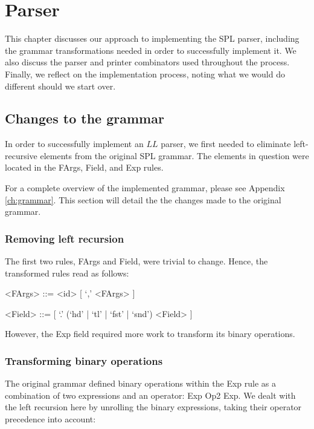 \chapter{Parser}

This chapter discusses our approach to implementing the SPL parser, including the grammar transformations needed in order to successfully implement it.
We also discuss the parser and printer combinators used throughout the process.
Finally, we reflect on the implementation process, noting what we would do different should we start over.

\section{Changes to the grammar}

In order to successfully implement an $LL$ parser, we first needed to eliminate left-recursive elements from the original SPL grammar.
The elements in question were located in the \textsf{FArgs}, \textsf{Field}, and \textsf{Exp} rules.

For a complete overview of the implemented grammar, please see Appendix \ref{ch:grammar}.
This section will detail the the changes made to the original grammar.

\subsection{Removing left recursion}

The first two rules, \textsf{FArgs} and \textsf{Field}, were trivial to change.
Hence, the transformed rules read as follows:

\begin{framed}
	\begin{grammar}
	<FArgs> ::= <id> [ `,' <FArgs> ]

	<Field> ::= [ `.' (`hd' | `tl' | `fst' | `snd') <Field> ]
	\end{grammar}
\end{framed}

However, the \textsf{Exp} field required more work to transform its binary operations.

\subsection{Transforming binary operations}

The original grammar defined binary operations within the \textsf{Exp} rule as a combination of two expressions and an operator: \textsf{Exp} \textsf{Op2} \textsf{Exp}.
We dealt with the left recursion here by unrolling the binary expressions, taking their operator precedence into account:

